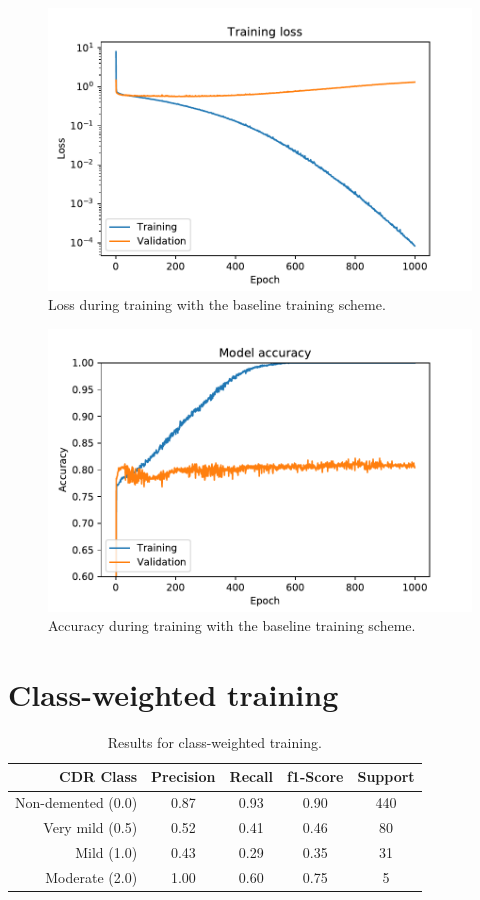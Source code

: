 \documentclass{kththesis}
\begin{document}
\begin{figure}[H]
  \centering
  \includegraphics[width=0.9\linewidth]{img/loss_default.pdf}
  \caption{Loss during training with the baseline training scheme.} \label{fig:loss_default}
\end{figure}
\begin{figure}[H]
  \centering
  \includegraphics[width=0.9\linewidth]{img/accuracy_default.pdf}
  \caption{Accuracy during training with the baseline training scheme.} \label{fig:accuracy_default}
\end{figure}


\section{Class-weighted training}
\begin{table}[H]
  \begin{center}
    \caption{Results for class-weighted training. \label{tab:results_class_weighted}}
    \begin{tabular}{r|ccc|c}
      \textbf{CDR Class} & \textbf{Precision} & \textbf{Recall} & \textbf{f1-Score} & \textbf{Support} \\
      \toprule
      Non-demented (0.0) & 0.87 & 0.93 & 0.90 & 440 \\
      Very mild (0.5) & 0.52 & 0.41 & 0.46 & 80  \\
      Mild (1.0)         & 0.43 & 0.29 & 0.35 & 31  \\
      Moderate (2.0)     & 1.00 & 0.60 & 0.75 & 5   \\
    \end{tabular}
  \end{center}
\end{table}
\end{document}
